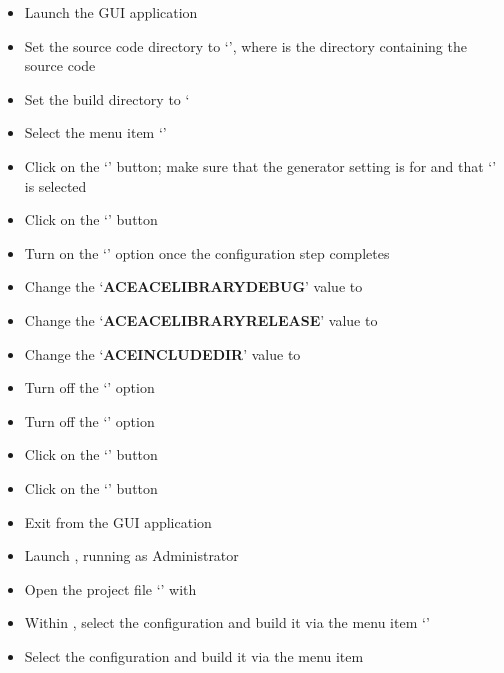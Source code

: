 \begin{itemize}
\item Launch the  GUI application
\item\exSp{} Set the source code directory to `',
where  is the directory containing the \mplusm{} source code
\item\exSp{} Set the build directory to `
\item\exSp{} Select the menu item `'
\item\exSp{} Click on the `' button; make sure that the generator
setting is for  and that `' is
selected
\item\exSp{} Click on the `' button
\item\exSp{} Turn on the `' option once the configuration step completes
\item\exSp{} Change the `\textbf{ACE\fUS{}ACE\fUS{}LIBRARY\fUS{}DEBUG}' value to
\item\exSp{} Change the `\textbf{ACE\fUS{}ACE\fUS{}LIBRARY\fUS{}RELEASE}' value to
\item\exSp{} Change the `\textbf{ACE\fUS{}INCLUDE\fUS{}DIR}' value to
\item\exSp{} Turn off the `' option
\item\exSp{} Turn off the `' option
\item\exSp{} Click on the `' button
\item\exSp{} Click on the `' button
\item\exSp{} Exit from the  GUI application
\item\exSp{} Launch , running as Administrator
\item\exSp{} Open the project file
`' with
\item\exSp{} Within , select the  configuration and
build it via the menu item `'
\item\exSp{} Select the  configuration and build it via the menu item

\end{itemize}
